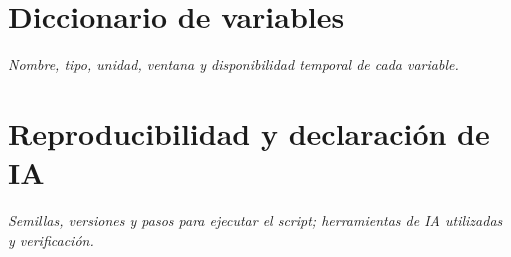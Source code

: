 \documentclass[titlepage,11pt,letterpaper]{article}
\newcommand{\instruccion}[1]{\par\smallskip\noindent\textit{\color{gray!75!black}#1}\par\smallskip}
\begin{document}
\section{Diccionario de variables}
\instruccion{Nombre, tipo, unidad, ventana y disponibilidad temporal de cada variable.}
\section{Reproducibilidad y declaración de IA}
\instruccion{Semillas, versiones y pasos para ejecutar el script; herramientas de IA utilizadas y verificación.}
\end{document}
